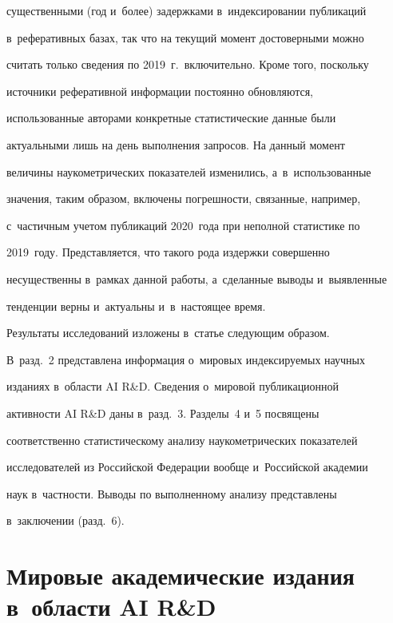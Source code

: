 существенными (год и~более) задержками в~индексировании публикаций 


в~реферативных базах, так что на текущий момент достоверными можно 


считать только сведения по 2019~г.\ включительно. Кроме того, поскольку 


источники реферативной информации постоянно обновляются, 


использованные авторами конкретные статистические данные были 


актуальными лишь на день выполнения запросов. На данный момент 


величины наукометрических показателей изменились, а~в~использованные 


значения, таким образом, включены погрешности, связанные, например, 


с~час\-тич\-ным учетом публикаций 2020~года при неполной статистике по 


2019~году. Представляется, что такого рода издержки совершенно 


несущественны в~рамках данной работы, а~сделанные выводы и~выявленные 


тенденции верны и~актуальны и~в~настоящее время.


 


 Результаты исследований изложены в~статье следующим образом. 


В~разд.~2 представлена информация о~мировых индексируемых научных 


изданиях в~об\-ласти AI R\&D. Сведения о~мировой публикационной 


активности AI R\&D даны в~разд.~3. Разделы~4 и~5 посвящены 


соответственно статистическому анализу наукометрических показателей 


исследователей из Российской Федерации вообще и~Российской академии 


наук в~частности. Выводы по выполненному анализу представлены 


в~заключении (разд.~6). 


 


\section{Мировые академические издания в~области AI R\&D}


 


